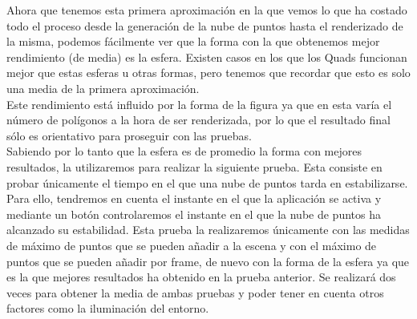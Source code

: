 Ahora que tenemos esta primera aproximación en la que vemos lo que ha costado todo el proceso desde la generación de la nube de puntos hasta el renderizado de la misma, podemos fácilmente ver que la forma con la que obtenemos mejor rendimiento (de media) es la esfera. Existen casos en los que los Quads funcionan mejor que estas esferas u otras formas, pero tenemos que recordar que esto es solo una media de la primera aproximación. \\

Este rendimiento está influido por la forma de la figura ya que en esta varía el número de polígonos a la hora de ser renderizada, por lo que el resultado final sólo es orientativo para proseguir con las pruebas. \\

Sabiendo por lo tanto que la esfera es de promedio la forma con mejores resultados, la utilizaremos para realizar la siguiente prueba. Esta consiste en probar únicamente el tiempo en el que una nube de puntos tarda en estabilizarse. Para ello, tendremos en cuenta el instante en el que la aplicación se activa y mediante un botón controlaremos el instante en el que la nube de puntos ha alcanzado su estabilidad. Esta prueba la realizaremos únicamente con las medidas de máximo de puntos que se pueden añadir a la escena y con el máximo de puntos que se pueden añadir por frame, de nuevo con la forma de la esfera ya que es la que mejores resultados ha obtenido en la prueba anterior. Se realizará dos veces para obtener la media de ambas pruebas y poder tener en cuenta otros factores como la iluminación del entorno.\\

\begin{table}[ht]
\centering
{}
\caption{Tiempo empleado por la aplicación para generar una nube de puntos estable. }
\label{cuadro:comparacionpesopreciosHMD}
\end{table}

